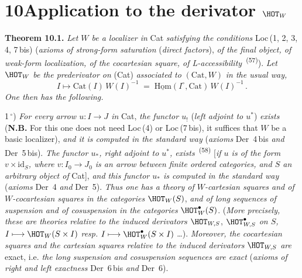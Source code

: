 

\section*{10\quad Application to the derivator $\HOT_W$}

\textbf{Theorem 10.1.} \textit{Let $W$ be a localizer in} Cat \textit{satisfying the conditions} Loc\,(1, 2, 3, 4, 7\,bis) (\textit{axioms of strong-form saturation} (\textit{direct factors}), \textit{of the final object, of weak-form localization, of the cocartesian square, of L-accessibility}~\textsuperscript{(57)}). \textit{Let} $\HOT_W$ \textit{be the prederivator on} (Cat) \textit{associated to} $(\mathrm{Cat}, W)$ \textit{in the usual way,}
\[
I \longmapsto \mathrm{Cat}(I)\,W(I)^{-1} \;=\; \underline{\mathrm{Hom}}(I^{\circ}, \mathrm{Cat})\,W(I)^{-1}\,. \tag*{(10.1.1)}
\]
\textit{One then has the following.}

1\,$^{\circ}$) \textit{For every arrow $u : I \longrightarrow J$ in} Cat, \textit{the functor $u_!$} (\textit{left adjoint to $u^*$}) \textit{exists} (\textbf{N.B.} For this one does not need Loc\,(4) or Loc\,(7\,bis), it suffices that $W$ be a basic localizer), \textit{and it is computed in the standard way} (\textit{axioms} Der~4\,bis \textit{and} Der~5\,bis). \textit{The functor $u_*$, right adjoint to $u^*$, exists}~\textsuperscript{(58)} [\textit{if $u$ is of the form $v \times \mathrm{id}_S$, where $v : I_0 \longrightarrow J_0$ is an arrow between finite ordered categories, and $S$ an arbitrary object of} Cat], \textit{and this functor $u_*$ is computed in the standard way} (\textit{axioms} Der~4 \textit{and} Der~5). \textit{Thus one has a theory of $W$-cartesian squares and of $W$-cocartesian squares in the categories} $\HOT_W(S)$, \textit{and of long sequences}
\textit{of suspension and of cosuspension in the categories} $\HOT^{\bullet}_W(S)$. (\textit{More precisely, these are theories relative to the induced derivators} $\HOT_{W,S}$, $\HOT^{\bullet}_{W,S}$ \textit{on $S$,} $I \longmapsto \HOT_W(S \times I)$ \textit{resp.} $I \longmapsto \HOT^{\bullet}_W(S \times I)$ \ldots). \textit{Moreover, the cocartesian squares and the cartesian squares relative to the induced derivators} $\HOT_{W,S}$ \textit{are} exact, i.e. \textit{the long suspension and cosuspension sequences are exact} (\textit{axioms of right and left exactness} Der~6\,bis \textit{and} Der~6).

